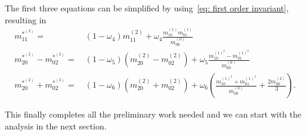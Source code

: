 The first three equations can be simplified by using~\eqref{eq: first order invariant}, resulting in
\begin{align}
  \label{eq: collide moments 11_2}
  m_{11}^{*^{(2)}}  =&\ (1-\omega_4)m_{11}^{(2)} + \omega_4 \frac{ m_{10}^{(1)}m_{01}^{(1)}}{m_{00}^{(0)}}
  \\
  \label{eq: collide moments 20m02_2}
  m_{20}^{*^{(2)}}-m_{02}^{*^{(2)}} =&\ (1-\omega_5) \left(m_{20}^{(2)}-m_{02}^{(2)}\right) + \omega_5 \frac{ m_{10}^{{(1)}^2} - m_{01}^{{(1)}^2}}{m_{00}^{(0)}}
  \\
  \label{eq: collide moments 20p02_2}
  m_{20}^{*^{(2)}}+m_{02}^{*^{(2)}}
  =&\ (1-\omega_6)\left(  m_{20}^{(2)} + m_{02}^{(2)}\right)
  + \omega_6 \left( \frac{ m_{10}^{{(1)}^2} + m_{01}^{{(1)}^2}}{m_{00}^{(0)}}
  + \frac{2 m_{00}^{(2)}}{3} \right).
\end{align}


This finally completes all the preliminary work needed and we can start with the analysis in the next section.
